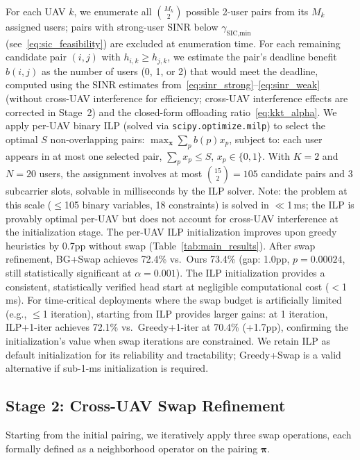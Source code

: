 \documentclass[journal]{IEEEtran}
\begin{document}
For each UAV $k$, we enumerate all $\binom{M_k}{2}$ possible 2-user pairs from its $M_k$ assigned users; pairs with strong-user SINR below $\gamma_{\text{SIC,min}}$ (see~\eqref{eq:sic_feasibility}) are excluded at enumeration time.
For each remaining candidate pair $(i, j)$ with $h_{i,k} \geq h_{j,k}$, we estimate the pair's deadline benefit $b(i,j)$ as the number of users (0, 1, or 2) that would meet the deadline, computed using the SINR estimates from~\eqref{eq:sinr_strong}--\eqref{eq:sinr_weak} (without cross-UAV interference for efficiency; cross-UAV interference effects are corrected in Stage~2) and the closed-form offloading ratio~\eqref{eq:kkt_alpha}.
We apply per-UAV binary ILP (solved via \texttt{scipy.optimize.milp}) to select the optimal $S$ non-overlapping pairs:
$\max_{\mathbf{x}} \sum_p b(p) x_p$, subject to: each user appears in at most one selected pair, $\sum_p x_p \leq S$, $x_p \in \{0,1\}$.
With $K\!=\!2$ and $N\!=\!20$ users, the assignment involves at most $\binom{15}{2} = 105$ candidate pairs and 3 subcarrier slots, solvable in milliseconds by the ILP solver.
Note: the problem at this scale ($\leq$105 binary variables, 18 constraints) is solved in $\ll$1\,ms; the ILP is provably optimal per-UAV but does not account for cross-UAV interference at the initialization stage.
The per-UAV ILP initialization improves upon greedy heuristics by 0.7pp without swap (Table~\ref{tab:main_results}).
After swap refinement, BG+Swap achieves 72.4\% vs.\ Ours 73.4\% (gap: 1.0pp, $p=0.00024$, still statistically significant at $\alpha=0.001$).
The ILP initialization provides a consistent, statistically verified head start at negligible computational cost ($<$1\,ms).
For time-critical deployments where the swap budget is artificially limited (e.g., $\leq$1 iteration), starting from ILP provides larger gains: at 1 iteration, ILP+1-iter achieves 72.1\% vs.\ Greedy+1-iter at 70.4\% (+1.7pp), confirming the initialization's value when swap iterations are constrained.
We retain ILP as default initialization for its reliability and tractability; Greedy+Swap is a valid alternative if sub-1-ms initialization is required.

\subsection{Stage 2: Cross-UAV Swap Refinement}

Starting from the initial pairing, we iteratively apply three swap operations, each formally defined as a neighborhood operator on the pairing $\boldsymbol{\pi}$.
\end{document}
